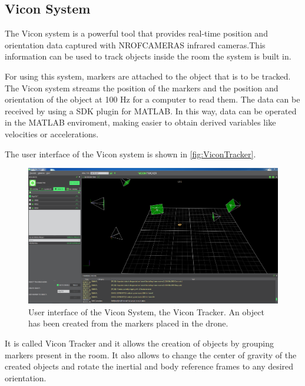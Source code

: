 \subsection{Vicon System}
The Vicon system is a powerful tool that provides real-time position and orientation data captured with NROFCAMERAS infrared cameras.This information can be used to track objects inside the room the system is built in.


For using this system, markers are attached to the object that is to be tracked. The Vicon system streams the position of the markers and the position and orientation of the object at 100 Hz for a computer to read them. The data can be received by using a SDK plugin for MATLAB. In this way, data can be operated in the MATLAB enviroment, making easier to obtain derived variables like velocities or accelerations.

The user interface of the Vicon system is shown in \autoref{fig:ViconTracker}. 
\begin{figure}[H]
	\centering
	\includegraphics[scale=0.27]{figures/ViconTracker}
	\caption{User interface of the Vicon System, the Vicon Tracker. An object has been created from the markers placed in the drone.}
	\label{fig:ViconTracker}
\end{figure}
It is called Vicon Tracker and it allows the creation of objects by grouping markers present in the room. It also allows to change the center of gravity of the created objects and rotate the inertial and body reference frames to any desired orientation.